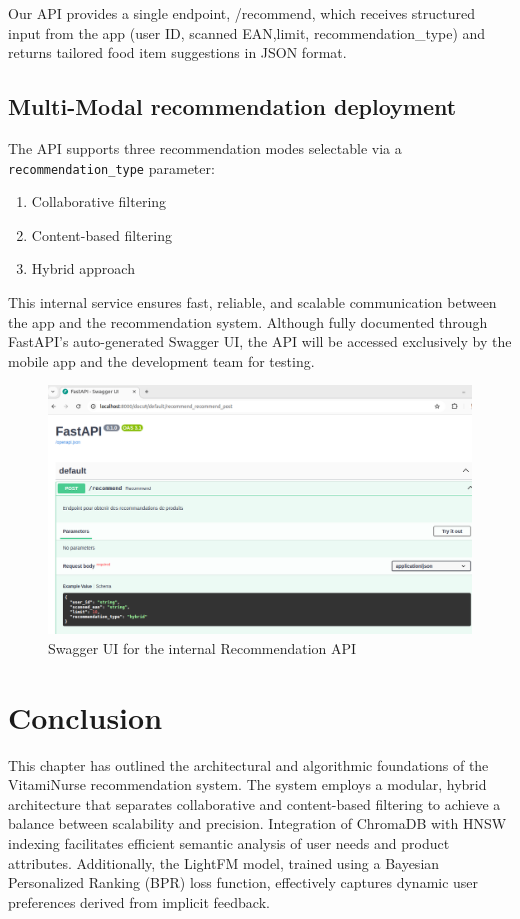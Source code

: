 \par Our API provides a single endpoint, /recommend, which receives structured input from the app (user ID, scanned EAN,limit, recommendation\_type) and returns tailored food item suggestions in JSON format.


\subsection{Multi-Modal recommendation deployment}
The API supports three recommendation modes selectable via a \texttt{recommendation\_type} parameter: 
\begin{enumerate}
    \item Collaborative filtering
    \item Content-based filtering
    \item Hybrid approach
\end{enumerate}

This internal service ensures fast, reliable, and scalable communication between the app and the recommendation system. Although fully documented through FastAPI’s auto-generated Swagger UI, the API will be accessed exclusively by the mobile app and the development team for testing.
 \begin{center}
    \begin{figure}[H]
        \includegraphics[scale=0.35]{images/swaggerFastAPI.png}
    \caption{Swagger UI for the internal Recommendation API} 
    \label{fig:swagger UI}
\end{figure}
\end{center}

\section*{Conclusion}
This chapter has outlined the architectural and algorithmic foundations of the VitamiNurse recommendation system. 
The system employs a modular, hybrid architecture that separates collaborative and content-based filtering to achieve a balance between scalability and precision. 
Integration of ChromaDB with HNSW indexing facilitates efficient semantic analysis of user needs and product attributes. 
Additionally, the LightFM model, trained using a Bayesian Personalized Ranking (BPR) loss function, effectively captures dynamic user preferences derived from implicit feedback.

